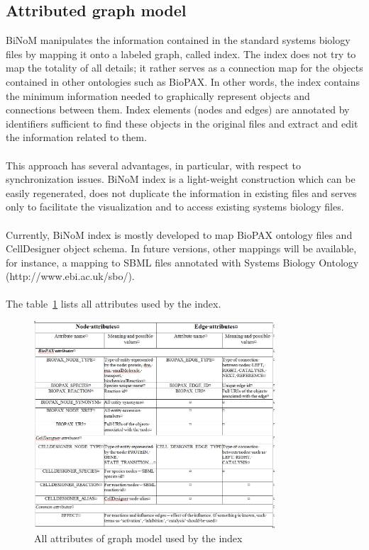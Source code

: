 \subsection{Attributed graph model}\label{Attributed_graph_model}
BiNoM manipulates the information contained in the standard systems biology files by mapping it onto a labeled graph, called index. The index does not try to map the totality of all details; it rather serves as a connection map for the objects contained in other ontologies such as BioPAX. In other words, the index contains the minimum information needed to graphically represent objects and connections between them. Index elements (nodes and edges) are annotated by identifiers sufficient to find these objects in the original files and extract and edit the information related to them.\\\\
This approach has several advantages, in particular, with respect to synchronization issues. BiNoM index is a light-weight construction which can be easily regenerated, does not duplicate the information in existing files and serves only to facilitate the visualization and to access existing systems biology files.\\\\
Currently, BiNoM index is mostly developed to map BioPAX ontology files and CellDesigner object schema. In future versions, other mappings will be available, for instance, a mapping to SBML files annotated with Systems Biology Ontology (http://www.ebi.ac.uk/sbo/).\\\\
The table~\ref{Attribute_table} lists all attributes used by the index.
\begin{figure}
\centering
\includegraphics[width=0.8\textwidth]{graphics/Attribute_table}
\caption{All attributes of graph model used by the index}
\label{Attribute_table}
\end{figure}

